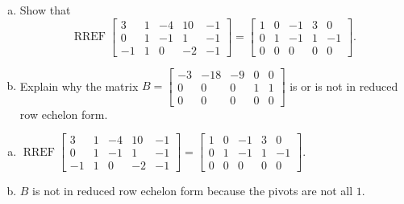 
\begin{exerciseStatement}

\begin{enumerate}[(a)]
\item Show that \[\operatorname{RREF} \left[\begin{array}{ccccc}
3 & 1 & -4 & 10 & -1 \\
0 & 1 & -1 & 1 & -1 \\
-1 & 1 & 0 & -2 & -1
\end{array}\right] = \left[\begin{array}{ccccc}
1 & 0 & -1 & 3 & 0 \\
0 & 1 & -1 & 1 & -1 \\
0 & 0 & 0 & 0 & 0
\end{array}\right] .\]
\item Explain why the matrix \(B= \left[\begin{array}{ccccc}
-3 & -18 & -9 & 0 & 0 \\
0 & 0 & 0 & 1 & 1 \\
0 & 0 & 0 & 0 & 0
\end{array}\right] \) is or is not in reduced row echelon form.
\end{enumerate}
    
\end{exerciseStatement}
    
\begin{exerciseAnswer} 

\begin{enumerate}[(a)]
\item \(\operatorname{RREF} \left[\begin{array}{ccccc}
3 & 1 & -4 & 10 & -1 \\
0 & 1 & -1 & 1 & -1 \\
-1 & 1 & 0 & -2 & -1
\end{array}\right] = \left[\begin{array}{ccccc}
1 & 0 & -1 & 3 & 0 \\
0 & 1 & -1 & 1 & -1 \\
0 & 0 & 0 & 0 & 0
\end{array}\right] .\)
\item \(B\) is not in reduced row echelon form because the pivots are not all \(1\). 
\end{enumerate}
    
\end{exerciseAnswer}
    
